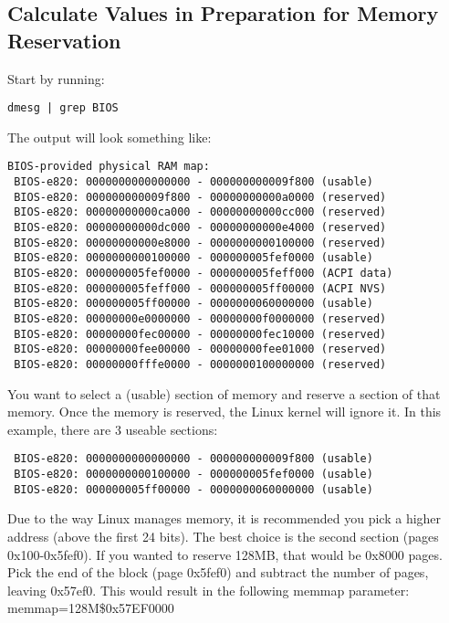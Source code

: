 \begin{flushleft}
\subsection{Calculate Values in Preparation for Memory Reservation}
Start by running: \\
\begin{lstlisting}
dmesg | grep BIOS
\end{lstlisting}
The output will look something like:
\begin{lstlisting}
BIOS-provided physical RAM map:
 BIOS-e820: 0000000000000000 - 000000000009f800 (usable)
 BIOS-e820: 000000000009f800 - 00000000000a0000 (reserved)
 BIOS-e820: 00000000000ca000 - 00000000000cc000 (reserved)
 BIOS-e820: 00000000000dc000 - 00000000000e4000 (reserved)
 BIOS-e820: 00000000000e8000 - 0000000000100000 (reserved)
 BIOS-e820: 0000000000100000 - 000000005fef0000 (usable)
 BIOS-e820: 000000005fef0000 - 000000005feff000 (ACPI data)
 BIOS-e820: 000000005feff000 - 000000005ff00000 (ACPI NVS)
 BIOS-e820: 000000005ff00000 - 0000000060000000 (usable)
 BIOS-e820: 00000000e0000000 - 00000000f0000000 (reserved)
 BIOS-e820: 00000000fec00000 - 00000000fec10000 (reserved)
 BIOS-e820: 00000000fee00000 - 00000000fee01000 (reserved)
 BIOS-e820: 00000000fffe0000 - 0000000100000000 (reserved)
\end{lstlisting}
 You want to select a (usable) section of memory and reserve a section of that
 memory.  Once the memory is reserved, the Linux kernel will ignore it.  In
 this example, there are 3 useable sections:\\
\begin{lstlisting}
 BIOS-e820: 0000000000000000 - 000000000009f800 (usable)
 BIOS-e820: 0000000000100000 - 000000005fef0000 (usable)
 BIOS-e820: 000000005ff00000 - 0000000060000000 (usable)
\end{lstlisting}
Due to the way Linux manages memory, it is recommended you pick a higher
address (above the first 24 bits).  The best choice is the second section
(pages 0x100-0x5fef0).  If you wanted to reserve 128MB, that would be
0x8000 pages.  Pick the end of the block (page 0x5fef0) and subtract the
number of pages, leaving 0x57ef0.  This would result in the following memmap
parameter:\\
\bigskip
memmap=128M\$0x57EF0000\\

\end{flushleft}
